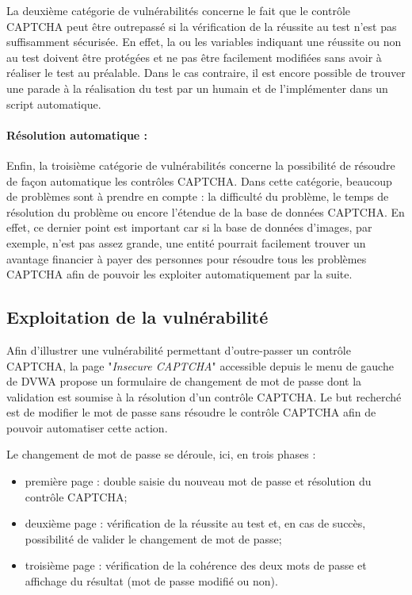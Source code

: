 La deuxième catégorie de vulnérabilités concerne le fait que le contrôle CAPTCHA peut être outrepassé si la vérification de la réussite au test n'est pas suffisamment sécurisée. En effet, la ou les variables indiquant une réussite ou non au test doivent être protégées et ne pas être facilement modifiées sans avoir à réaliser le test au préalable. Dans le cas contraire, il est encore possible de trouver une parade à la réalisation du test par un humain et de l'implémenter dans un script automatique.

\paragraph{Résolution automatique :}

Enfin, la troisième catégorie de vulnérabilités concerne la possibilité de résoudre de façon automatique les contrôles CAPTCHA. Dans cette catégorie, beaucoup de problèmes sont à prendre en compte : la difficulté du problème, le temps de résolution du problème ou encore l'étendue de la base de données CAPTCHA. En effet, ce dernier point est important car si la base de données d'images, par exemple, n'est pas assez grande, une entité pourrait facilement trouver un avantage financier à payer des personnes pour résoudre tous les problèmes CAPTCHA afin de pouvoir les exploiter automatiquement par la suite.

\subsection{Exploitation de la vulnérabilité}
\label{vul_captcha}

Afin d'illustrer une vulnérabilité permettant d'outre-passer un contrôle CAPTCHA, la page "\textit{Insecure CAPTCHA}" accessible depuis le menu de gauche de DVWA propose un formulaire de changement de mot de passe dont la validation est soumise à la résolution d'un contrôle CAPTCHA. Le but recherché est de modifier le mot de passe sans résoudre le contrôle CAPTCHA afin de pouvoir automatiser cette action.

Le changement de mot de passe se déroule, ici, en trois phases : 
\begin{itemize}
\item première page : double saisie du nouveau mot de passe et résolution du contrôle CAPTCHA;
\item deuxième page : vérification de la réussite au test et, en cas de succès, possibilité de valider le changement de mot de passe;
\item troisième page : vérification de la cohérence des deux mots de passe et affichage du résultat (mot de passe modifié ou non).
\end{itemize}

